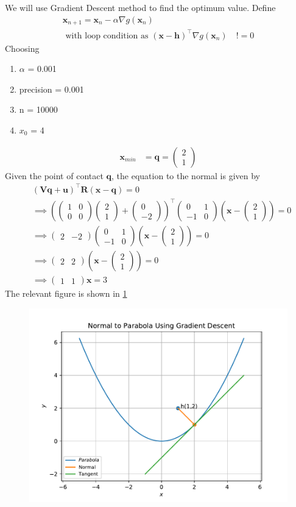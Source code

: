 \documentclass[12pt]{article}
\providecommand{\brak}[1]{\ensuremath{\left(#1\right)}}
\newcommand{\myvec}[1]{\ensuremath{\begin{pmatrix}#1\end{pmatrix}}}
\let\vec\mathbf
\begin{document}
\begin{enumerate}
We will use Gradient Descent method to find the optimum value. Define
\begin{align}
	\label{eq:grad_des}
	\vec{x}_{n+1} = \vec{x}_n - \alpha \nabla g\brak{\vec{x}_n} \\
	\text{ with loop condition as } \brak{\vec{x}-\vec{h}}^\top\nabla g\brak{\vec{x}_n} \quad != 0 
\end{align}
Choosing
\begin{enumerate}
\item $\alpha$ = 0.001
\item precision = 0.001
\item n = 10000
\item $x_0$ = 4 
\end{enumerate}
\begin{align}
	\vec{x}_{min} &= \vec{q} = \myvec{ 2 \\1} 
\end{align}
Given the point of contact $\vec{q}$, the equation to the normal is given by
\begin{align}
	&\brak{\vec{V}\vec{q}+\vec{u}}^\top\vec{R}\brak{\vec{x}-\vec{q}} = 0 \\
	&\implies \brak{\myvec{1&0\\0&0}\myvec{2\\1}+\myvec{0 \\ -2}}^\top \myvec{0&1 \\-1&0}\brak{\vec{x}-\myvec{2\\1}} =0\\
	&\implies \myvec{2&-2} \myvec{0&1 \\-1&0}\brak{\vec{x}-\myvec{2\\1}} = 0 \\
	&\implies \myvec{2&2}\brak{\vec{x}-\myvec{2\\1}} = 0 \\
	&\implies \myvec{1&1}\vec{x} = 3 
\end{align}
The relevant figure is shown in \ref{fig:Fig1}
\begin{figure}[!h]
	\begin{center}
		\includegraphics[width=\columnwidth]{figs/problem23.pdf}
	\end{center}
\caption{}
\label{fig:Fig1}
\end{figure}
\end{enumerate}
\end{document}
